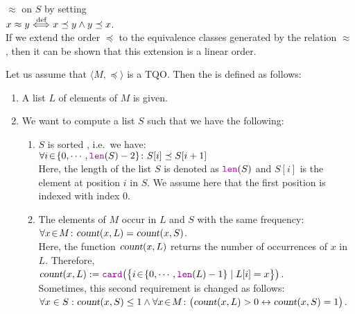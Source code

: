 $\approx$ on $S$ by setting
\\[0.2cm]
\hspace*{1.3cm}
$x \approx y \stackrel{\mbox{\scriptsize def}}{\Longleftrightarrow} x \preceq y \wedge y \preceq x$. 
\\[0.2cm]
If we extend the order $\preceq$ to the equivalence classes generated by the relation $\approx$,
then it can be shown that this extension is a linear order.
\vspace*{0.3cm}

Let us assume that $\langle M, \preceq \rangle$ is a  \textsc{TQO}.
Then the  is defined as follows:
\begin{enumerate}
\item A list $L$ of elements of $M$ is given.
\item We want to compute a list $S$ such that we have the following: 
  \begin{enumerate}
  \item $S$ is sorted , i.e.~we have: \\[0.2cm]
        \hspace*{1.3cm} 
        $\forall i \el \{ 0, \cdots, \mytt{len}(S)-2 \} \colon S[i] \preceq S[i+1]$ 
        \\[0.2cm]
        Here, the length of the list $S$ is denoted as $\mytt{len}(S)$ and $S[i]$ is the element at position
        $i$ in $S$.  We assume here that the first position is indexed with index $0$.
  \item The elements of $M$ occur in $L$ and $S$ with the same frequency: \\[0.2cm]
        \hspace*{1.3cm} 
        $\forall x\!\in\! M \colon \textsl{count}(x,L) = \textsl{count}(x,S)$.
        \\[0.2cm]
        Here, the function $\textsl{count}(x,L)$ returns the number of occurrences of $x$ in $L$.
        Therefore,  \\[0.2cm]
        \hspace*{1.3cm}
        $\textsl{count}(x,L) := \mytt{card}\bigl(\bigl\{ i \el \{0,\cdots,\mytt{len}(L)-1\} \mid L[i] = x \bigr\}\bigr)$.
        \\[0.2cm]
        Sometimes, this second requirement is changed as follows:
        \\[0.2cm]
        \hspace*{1.3cm}
        $\forall x \in S: \textsl{count}(x,S) \leq 1 \wedge \forall x\!\in\! M \colon \bigl(\textsl{count}(x,L) > 0 \leftrightarrow \textsl{count}(x,S) = 1\bigr)$.

\end{enumerate}
\end{enumerate}
